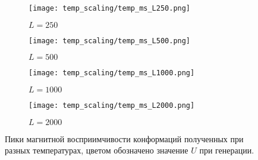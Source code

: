 \begin{figure}[ht]
	\centering
    \begin{subfigure}[t]{0.4\textwidth}
        \texttt{[image: temp\_scaling/temp\_ms\_L250.png]}
        \caption*{$L = 250$}
    \end{subfigure} 
    \begin{subfigure}[t]{0.4\textwidth}
        \texttt{[image: temp\_scaling/temp\_ms\_L500.png]}
        \caption*{$L = 500$}

    \end{subfigure}
    \begin{subfigure}[t]{0.4\textwidth}
        \texttt{[image: temp\_scaling/temp\_ms\_L1000.png]}
        \caption*{$L = 1000$}
    \end{subfigure}
    \begin{subfigure}[t]{0.4\textwidth}
        \texttt{[image: temp\_scaling/temp\_ms\_L2000.png]}
        \caption*{$L = 2000$}
    \end{subfigure}
	\caption{Пики магнитной восприимчивости конформаций полученных при разных температурах, цветом обозначено значение $U$ при генерации.}
	\label{fig:temp_scaling_ms}
\end{figure}


